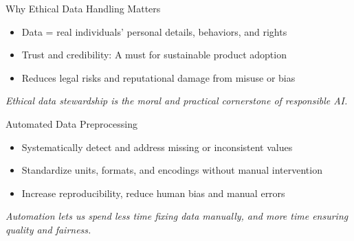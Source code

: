 \documentclass[aspectratio=169]{beamer}
\begin{document}
%
%
\begin{frame}{Why Ethical Data Handling Matters}
\begin{itemize}
\item Data = real individuals’ personal details, behaviors, and rights
\item Trust and credibility: A must for sustainable product adoption
\item Reduces legal risks and reputational damage from misuse or bias
\end{itemize}

\emph{Ethical data stewardship is the moral and practical cornerstone of responsible AI.}
\end{frame}

%
%
\begin{frame}{Automated Data Preprocessing}
\begin{itemize}
\item Systematically detect and address missing or inconsistent values
\item Standardize units, formats, and encodings without manual intervention
\item Increase reproducibility, reduce human bias and manual errors
\end{itemize}

\emph{Automation lets us spend less time fixing data manually, and more time ensuring quality and fairness.}
\end{frame}
\end{document}
